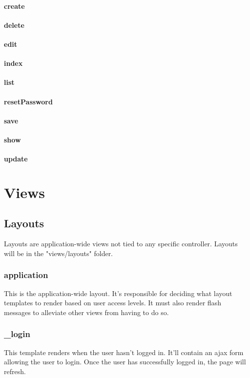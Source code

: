 \documentclass[12pt]{article}
\begin{document}
\paragraph{create}
\paragraph{delete}
\paragraph{edit}
\paragraph{index}
\paragraph{list}
\paragraph{resetPassword}
\paragraph{save}
\paragraph{show}
\paragraph{update}


\section{Views}
\subsection{Layouts}
Layouts are application-wide views not tied to any specific controller. Layouts will be in the "views/layouts" folder.
\subsubsection{application}
This is the application-wide layout. It's responsible for deciding what layout templates to render based on user access levels.
It must also render flash messages to alleviate other views from having to do so.
\subsubsection{\_login}
This template renders when the user hasn't logged in. It'll contain an ajax form allowing the user to login.
Once the user has successfully logged in, the page will refresh.
\end{document}
